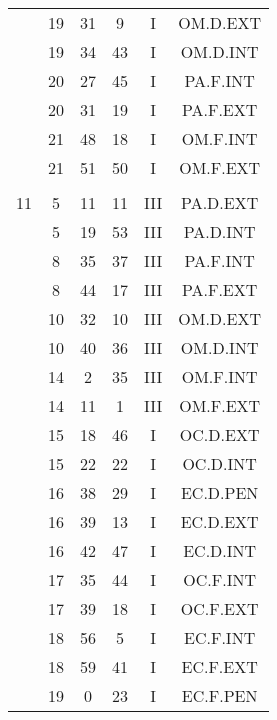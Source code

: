 \documentclass[12pt, a4paper]{article}
\begin{document}
\begin{multicols}{3}
{\begin{tabular}{c c c c c c}
	 	 	 	 & 19 & 31 & 9 & I & OM.D.EXT\\%
	 	 	 	 & 19 & 34 & 43 & I & OM.D.INT\\%
	 	 	 	 & 20 & 27 & 45 & I & PA.F.INT\\%
	 	 	 	 & 20 & 31 & 19 & I & PA.F.EXT\\%
	 	 	 	 & 21 & 48 & 18 & I & OM.F.INT\\%
	 	 	 	 & 21 & 51 & 50 & I & OM.F.EXT\\%
	 	 	 	 & & & & & \\%
	 	 	 	11 & 5 & 11 & 11 & III & PA.D.EXT\\%
	 	 	 	 & 5 & 19 & 53 & III & PA.D.INT\\%
	 	 	 	 & 8 & 35 & 37 & III & PA.F.INT\\%
	 	 	 	 & 8 & 44 & 17 & III & PA.F.EXT\\%
	 	 	 	 & 10 & 32 & 10 & III & OM.D.EXT\\%
	 	 	 	 & 10 & 40 & 36 & III & OM.D.INT\\%
	 	 	 	 & 14 & 2 & 35 & III & OM.F.INT\\%
	 	 	 	 & 14 & 11 & 1 & III & OM.F.EXT\\%
	 	 	 	 & 15 & 18 & 46 & I & OC.D.EXT\\%
	 	 	 	 & 15 & 22 & 22 & I & OC.D.INT\\%
	 	 	 	 & 16 & 38 & 29 & I & EC.D.PEN\\%
	 	 	 	 & 16 & 39 & 13 & I & EC.D.EXT\\%
	 	 	 	 & 16 & 42 & 47 & I & EC.D.INT\\%
	 	 	 	 & 17 & 35 & 44 & I & OC.F.INT\\%
	 	 	 	 & 17 & 39 & 18 & I & OC.F.EXT\\%
	 	 	 	 & 18 & 56 & 5 & I & EC.F.INT\\%
	 	 	 	 & 18 & 59 & 41 & I & EC.F.EXT\\%
	 	 	 	 & 19 & 0 & 23 & I & EC.F.PEN\\%
	 	 \end{tabular}
 	}
\end{multicols}
\end{document}
